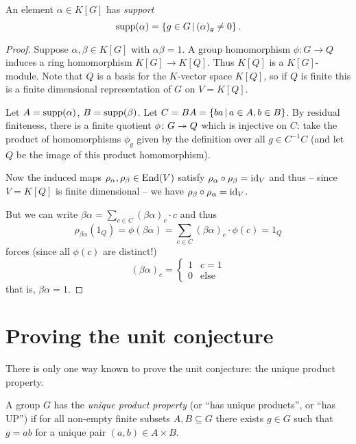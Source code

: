 \begin{definition}
    An element $\alpha \in K[G]$ has \emph{support} \[
        \operatorname{supp}(\alpha) = \left\{  g \in G  \,\middle|\,  (\alpha)_g \neq 0  \right\}.
    \]
\end{definition}

\begin{proof}
    Suppose $\alpha, \beta \in K[G]$ with $\alpha \beta = 1$.
    A group homomorphism $\phi \colon G \to Q$ induces a ring homomorphism $K[G] \to K[Q]$.
    Thus $K[Q]$ is a $K[G]$-module.
    Note that $Q$ is a basis for the $K$-vector space $K[Q]$, so if $Q$ is finite this is a finite dimensional representation of $G$ on $V = K[Q]$.

    Let $A = \operatorname{supp}(\alpha)$, $B = \operatorname{supp}(\beta)$.
    Let $C = BA = \left\{  ba  \,\middle|\,  a \in A, b \in B \right\}$.
    By residual finiteness, there is a finite quotient $\phi \colon G \twoheadrightarrow Q$ which is injective on $C$: take the product of homomorphisms $\phi_g$ given by the definition over all $g \in C^{-1} C$ (and let $Q$ be the image of this product homomorphism).

    Now the induced maps $\rho_\alpha, \rho_\beta \in \mathrm{End}(V)$ satisfy $\rho_\alpha \circ \rho_\beta = \mathrm{id}_V$ and thus -- since $V = K[Q]$ is finite dimensional -- we have $\rho_\beta \circ \rho_\alpha = \mathrm{id}_V$.

    But we can write $\beta \alpha = \sum_{c \in C} (\beta \alpha)_c \cdot c$ and thus \[
        \rho_{\beta \alpha}(1_Q) = \phi(\beta \alpha) = \sum_{c \in C} (\beta \alpha)_c \cdot \phi(c) = 1_Q
    \] forces (since all $\phi(c)$ are distinct!) \[
        (\beta \alpha)_c = \begin{cases}
            1 & c = 1 \\
            0 & \text{else}
        \end{cases}
    \] that is, $\beta \alpha = 1$.
\end{proof}

\section{Proving the unit conjecture}

There is only one way known to prove the unit conjecture: the unique product property.

\begin{definition}
    A group $G$ has the \emph{unique product property} (or ``has unique products'', or ``has UP'') if for all non-empty finite subsets $A, B \subseteq G$ there exists $g \in G$ such that $g = ab$ for a unique pair $(a, b) \in A \times B$.
\end{definition}

